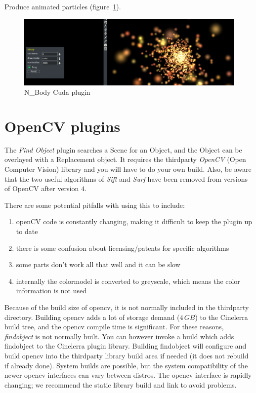 {Produce animated particles (figure~\ref{fig:n_body}).

\begin{figure}[hbtp]
	\centering
	\includegraphics[width=1.0\linewidth]{images/n_body.png}
	\caption{N\_Body Cuda plugin}
	\label{fig:n_body}
\end{figure}

\section{OpenCV plugins}%
\label{sec:opencv_plugins}

The \textit{Find Object} plugin searches a Scene for an Object, and the Object can be overlayed with a Replacement object. It requires the thirdparty \textit{OpenCV} (Open Computer Vision) library and you will have to do your own build. Also, be aware that the two useful algorithms of \textit{Sift} and \textit{Surf} have been removed from versions of OpenCV after version $4$.

There are some potential pitfalls with using this to include:

\begin{enumerate}
    \item openCV code is constantly changing, making it difficult to keep the plugin up to date
    \item there is some confusion about licensing/patents for specific algorithms
    \item some parts don’t work all that well and it can be slow
    \item internally the colormodel is converted to greyscale, which means the color information is not used
\end{enumerate}

Because of the build size of opencv, it is not normally included in the thirdparty directory. Building opencv adds a lot of storage demand ($4\,GB$) to the Cinelerra build tree, and the opencv compile time is significant. For these reasons, \textit{findobject} is not normally built. You can however invoke a build which adds findobject to the Cinelerra plugin library. Building findobject will configure and build opencv into the thirdparty library build area if needed (it does not rebuild if already done). System builds are possible, but the system compatibility of the newer opencv interfaces can vary between distros. The opencv interface is rapidly changing; we recommend the static library build and link to avoid problems.

}
